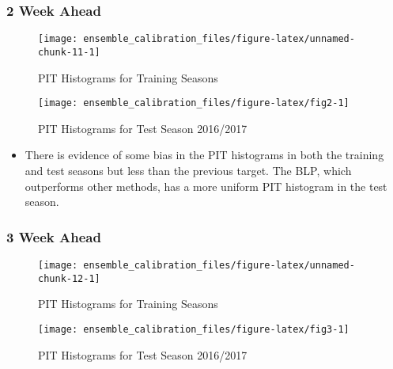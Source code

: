 \documentclass[
]{article}
\begin{document}
\newpage

\hypertarget{week-ahead-1}{%
\subsubsection{2 Week Ahead}\label{week-ahead-1}}

\begin{figure}[H]

{\centering \texttt{[image: ensemble\_calibration\_files/figure-latex/unnamed-chunk-11-1]} 

}

\caption{PIT Histograms for Training Seasons}\label{fig:unnamed-chunk-11}
\end{figure}

\newpage

\begin{figure}[H]

{\centering \texttt{[image: ensemble\_calibration\_files/figure-latex/fig2-1]} 

}

\caption{PIT Histograms for Test Season 2016/2017}\label{fig:fig2}
\end{figure}

\begin{itemize}
\item There is evidence of some bias in the PIT histograms in both the training and test seasons but less than the previous target. The BLP, which outperforms other methods, has a more uniform PIT histogram in the test season.
\end{itemize}

\newpage

\hypertarget{week-ahead-2}{%
\subsubsection{3 Week Ahead}\label{week-ahead-2}}

\begin{figure}[H]

{\centering \texttt{[image: ensemble\_calibration\_files/figure-latex/unnamed-chunk-12-1]} 

}

\caption{PIT Histograms for Training Seasons}\label{fig:unnamed-chunk-12}
\end{figure}

\newpage

\begin{figure}[H]

{\centering \texttt{[image: ensemble\_calibration\_files/figure-latex/fig3-1]} 

}

\caption{PIT Histograms for Test Season 2016/2017}\label{fig:fig3}
\end{figure}
\end{document}
